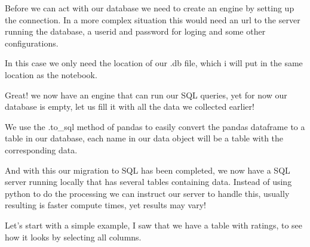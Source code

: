 \documentclass[letterpaper,10pt,english]{jupyterBook}
\begin{document}
\sphinxAtStartPar
Before we can act with our database we need to create an engine by setting up the connection. In a more complex situation this would need an url to the server running the database, a userid and password for loging and some other configurations.

\sphinxAtStartPar
In this case we only need the location of our .db file, which i will put in the same location as the notebook.

\begin{sphinxVerbatim}[commandchars=\\\{\}]
  
\end{sphinxVerbatim}

\sphinxAtStartPar
Great! we now have an engine that can run our SQL queries, yet for now our database is empty, let us fill it with all the data we collected earlier!

\sphinxAtStartPar
We use the .to\_sql method of pandas to easily convert the pandas dataframe to a table in our database, each name in our data object will be a table with the corresponding data.

\begin{sphinxVerbatim}[commandchars=\\\{\}]
    
      
\end{sphinxVerbatim}

\sphinxAtStartPar
And with this our migration to SQL has been completed, we now have a SQL server running locally that has several tables containing data.
Instead of using python to do the processing we can instruct our server to handle this, usually resulting is faster compute times, yet results may vary!

\sphinxAtStartPar
Let’s start with a simple example, I saw that we have a table with ratings, to see how it looks by selecting all columns.

\begin{sphinxVerbatim}[commandchars=\\\{\}]
  
\end{sphinxVerbatim}
\end{document}
